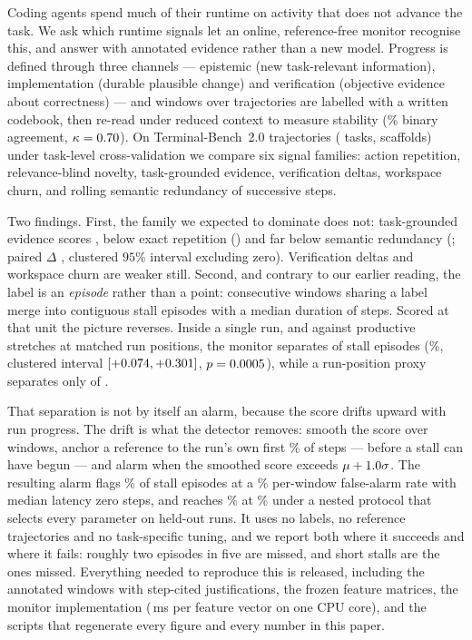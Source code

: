 Coding agents spend much of their runtime on activity that does not advance the task. We ask which
runtime signals let an online, reference-free monitor recognise this, and answer with annotated evidence
rather than a new model. Progress is defined through three channels --- epistemic (new task-relevant
information), implementation (durable plausible change) and verification (objective evidence about
correctness) --- and \pannWindowsTotal{} windows over \pannTrajTotal{} trajectories are labelled with a
written codebook, then re-read under reduced context to measure stability (\pannBinaryAgr{}\% binary
agreement, $\kappa=0.70$). On \pnTraj{} Terminal-Bench~2.0 trajectories (\pnTasks{} tasks,
\pcorpusScaffolds{} scaffolds) under task-level cross-validation we compare six signal families: action
repetition, relevance-blind novelty, task-grounded evidence, verification deltas, workspace churn, and
rolling semantic redundancy of successive steps.

Two findings. First, the family we expected to dominate does not: task-grounded evidence scores
\paucCOneevidence{}, below exact repetition (\paucBTworepThree{}) and far below semantic redundancy
(\paucBFoursemantic{}; paired $\Delta$ \ppairCOneevvsBFoursemDelta{}, clustered $95\%$ interval excluding
zero). Verification deltas and workspace churn are weaker still. Second, and contrary to our earlier
reading, the label is an \emph{episode} rather than a point: consecutive windows sharing a label merge
into \pregEpisodes{} contiguous stall episodes with a median duration of \pregMedianSteps{} steps. Scored
at that unit the picture reverses. Inside a single run, and against productive stretches at matched run
positions, the monitor separates \pregPmSep{} of \pregPmTot{} stall episodes (\pregPmPct{}\%, clustered
interval $[+0.074{},+0.301{}]$, $p=0.0005{}$), while a run-position proxy separates only
\pregProxySep{} of \pregProxyTot{}.

That separation is not by itself an alarm, because the score drifts upward with run progress. The drift is
what the detector removes: smooth the score over \palSmooth{} windows, anchor a reference to the run's own
first \palOpen{}\% of steps --- before a stall can have begun --- and alarm when the smoothed score exceeds
$\mu+1.0{}\sigma$. The resulting alarm flags \palDet{}\% of stall episodes at a \palFaWin{}\%
per-window false-alarm rate with median latency zero steps, and reaches \pnestedDet{}\% at \pnestedFa{}\%
under a nested protocol that selects every parameter on held-out runs. It uses no labels, no reference
trajectories and no task-specific tuning, and we report both where it succeeds and where it fails: roughly
two episodes in five are missed, and short stalls are the ones missed. Everything needed to reproduce this
is released, including the annotated windows with step-cited justifications, the frozen feature matrices,
the monitor implementation (\prtMsPerWindow\,ms per feature vector on one CPU core), and the scripts that
regenerate every figure and every number in this paper.

